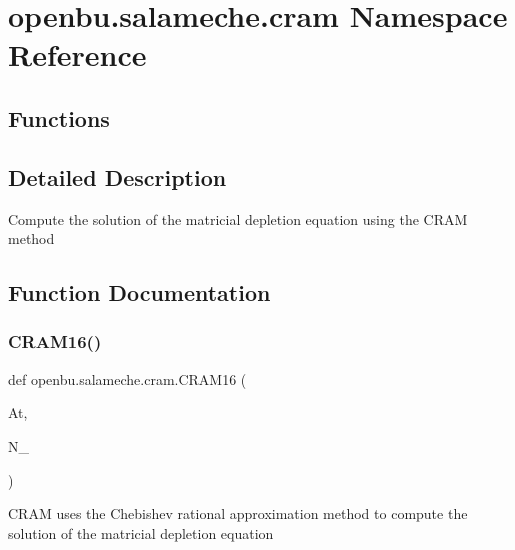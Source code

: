 \hypertarget{namespaceopenbu_1_1salameche_1_1cram}{}\section{openbu.\+salameche.\+cram Namespace Reference}
\label{namespaceopenbu_1_1salameche_1_1cram}
\subsection*{Functions}


\subsection{Detailed Description}
\begin{DoxyVerb}Compute the solution of the matricial depletion equation using the CRAM method\end{DoxyVerb}
 

\subsection{Function Documentation}
\mbox{\label{namespaceopenbu_1_1salameche_1_1cram_a669fd4b90e42c8ce2f944db072d7abc3}} 
\subsubsection{\texorpdfstring{C\+R\+A\+M16()}{CRAM16()}}
{\footnotesize\ttfamily def openbu.\+salameche.\+cram.\+C\+R\+A\+M16 (\begin{DoxyParamCaption}\item[{}]{At,  }\item[{}]{N\+\_ }\end{DoxyParamCaption})}

\begin{DoxyVerb}CRAM uses the Chebishev rational approximation method to compute the solution of the matricial depletion equation\end{DoxyVerb}
 \mbox{\label{namespaceopenbu_1_1salameche_1_1cram_a4a95765dc354f6f40f92b7a7a1712b7b}} 
